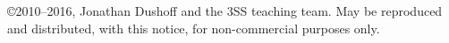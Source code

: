 \copyright 2010--2016, Jonathan Dushoff and the 3SS teaching team.  May be reproduced and distributed, with this notice, for non-commercial purposes only.
